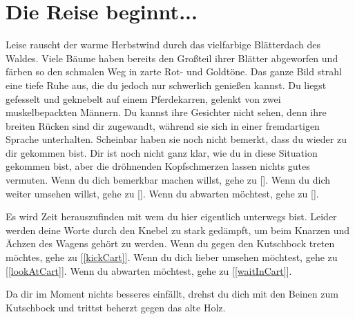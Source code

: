 \chapter{Die Reise beginnt...}

Leise rauscht der warme Herbstwind durch das vielfarbige Blätterdach des Waldes. Viele Bäume haben bereits den Großteil ihrer Blätter abgeworfen und färben so den schmalen Weg in zarte Rot- und Goldtöne. Das ganze Bild strahl eine tiefe Ruhe aus, die du jedoch nur schwerlich genießen kannst. Du liegst gefesselt und geknebelt auf einem Pferdekarren, gelenkt von zwei muskelbepackten Männern. Du kannst ihre Gesichter nicht sehen, denn ihre breiten Rücken sind dir zugewandt, während sie sich in einer fremdartigen Sprache unterhalten. Scheinbar haben sie noch nicht bemerkt, dass du wieder zu dir gekommen bist. Dir ist noch nicht ganz klar, wie du in diese Situation gekommen bist, aber die dröhnenden Kopfschmerzen lassen nichts gutes vermuten.
Wenn du dich bemerkbar machen willst, gehe zu [].
Wenn du dich weiter umsehen willst, gehe zu [].
Wenn du abwarten möchtest, gehe zu [].


Es wird Zeit herauszufinden mit wem du hier eigentlich unterwegs bist. Leider werden deine Worte durch den Knebel zu stark gedämpft, um beim Knarzen und Ächzen des Wagens gehört zu werden.
Wenn du gegen den Kutschbock treten möchtes, gehe zu [\ref{kickCart}].
Wenn du dich lieber umsehen möchtest, gehe zu [\ref{lookAtCart}].
Wenn du abwarten möchtest, gehe zu [\ref{waitInCart}].


Da dir im Moment nichts besseres einfällt, drehst du dich mit den Beinen zum Kutschbock und trittst beherzt gegen das alte Holz.
